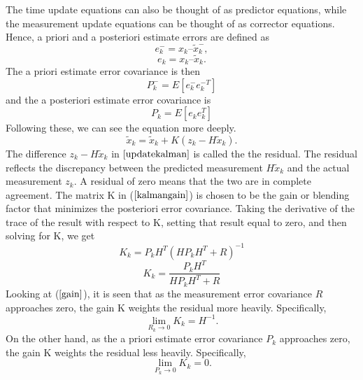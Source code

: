 \documentclass[a4paper,10pt]{report}
\begin{document}
The time update equations can also be thought of as predictor equations, while the measurement update equations can be thought of as corrector equations.
\newline
Hence, a priori and a posteriori estimate errors are defined as
\begin{equation}
e_k^- = x_k – \tilde x_k^- ,
\end{equation}
\begin{equation}
e_k =  x_k – \tilde x_k.
\end{equation}
The a priori estimate error covariance is then
\begin{equation}
P_k^- = E[ e_k^- e_k^{-T} ]
\end{equation}
and the a posteriori estimate error covariance is
\begin{equation}
P_k = E[e_k e_k^T]
\end{equation}
Following these, we can see the equation more deeply.
\begin{equation}
\tilde x_k = \tilde x_k + K(z_k-H\tilde x_k).
\label{updatekalman}
\end{equation}
The difference $z_k - H\tilde x_k$ in $\ref{updatekalman}$ is called the the residual. The residual reflects the discrepancy between the
predicted measurement $H\tilde x_k$ and the actual measurement $z_k$. A residual of zero means that the two are in complete
agreement. \newline
The matrix K in ($\ref{kalmangain}$) is chosen to be the gain or blending factor that minimizes the posteriori error covariance. Taking the derivative of the trace of the result with respect to K, setting that result equal to zero, and then solving for K, we get
\begin{equation}
K_k = P_kH^{T}(HP_kH^{T} + R)^{-1}
\end{equation}
\begin{equation}
K_k = \frac{P_kH^T}{HP_kH^T + R} \label{gain}
\end{equation}
Looking at ($\ref{gain}$), it is seen that as the measurement error covariance $R$ approaches zero, the gain K weights the residual more
heavily. Specifically,
\begin{equation}
\mathop {\lim }\limits_{R_k \to 0 } {K_k} = H^{-1}.
\end{equation}
On the other hand, as the a priori estimate error covariance $P_k$ approaches zero, the gain K weights the residual less heavily. Specifically,
\begin{equation}
\mathop {\lim }\limits_{P_k \to 0 } {K_k} = 0.
\end{equation}
\end{document}
